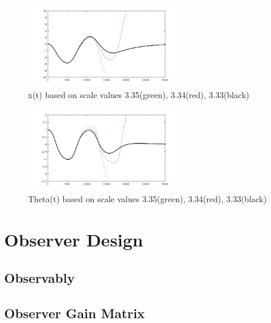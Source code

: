 \documentclass{article}
\begin{document}
\begin{figure}[H]
    \centering
    \includegraphics[width=0.6\textwidth]{x_t-max_scalar.jpg}
    \caption{x(t) based on scale values 3.35(green), 3.34(red), 3.33(black)}
    \label{fig:x_segway}
\end{figure}

\begin{figure}[H]
    \centering
    \includegraphics[width=0.6\textwidth]{th_t-max_scalar.jpg}
    \caption{Theta(t) based on scale values 3.35(green), 3.34(red), 3.33(black)}
    \label{fig:th_segway}
\end{figure}

\section{Observer Design}

\subsection{Observably}



\subsection{Observer Gain Matrix}


\end{document}
